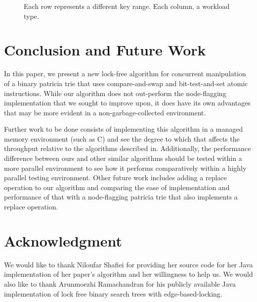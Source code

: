 \documentclass[conference]{IEEEtran}
\begin{document}
\begin{figure}
\caption{Each row represents a different key range. Each column, a workload type.}
\end{figure}
\clearpage


\section{Conclusion and Future Work}
In this paper, we present a new lock-free algorithm for concurrent manipulation of a binary patricia trie that uses compare-and-swap and bit-test-and-set atomic instructions. While our algorithm does not out-perform the node-flagging implementation that we sought to improve upon, it does have its own advantages that may be more evident in a non-garbage-collected environment.
\par
Further work to be done consists of implementing this algorithm in a managed memory environment (such as C) and see the degree to which that affects the throughput relative to the algorithms described in\cite{Shafiei2013}\cite{Natarajan2014}. Additionally, the performance difference between ours and other similar algorithms should be tested within a more parallel environment to see how it performs comparatively within a highly parallel testing environment. Other future work includes adding a replace operation to our algorithm and comparing the ease of implementation and performance of that with a node-flagging patricia trie that also implements a replace operation\cite{Shafiei2013}.


\section{Acknowledgment}
We would like to thank Niloufar Shafiei for providing her source code for her Java implementation of her paper's algorithm\cite{Shafiei2013} and her willingness to help us. We would also like to thank Arunmoezhi Ramachandran for his publicly available Java implementation of lock free binary search trees with edge-based-locking\cite{LFBST}.




\end{document}
